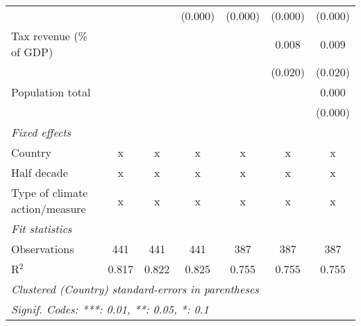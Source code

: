 \begin{tabular}{lcccccc}
                                                                                  &               &                & (0.000)        & (0.000)       & (0.000)      & (0.000)\\   
   Tax revenue (\% of GDP)                                                        &               &                &                &               & 0.008        & 0.009\\   
                                                                                  &               &                &                &               & (0.020)      & (0.020)\\   
   Population total                                                               &               &                &                &               &              & 0.000\\   
                                                                                  &               &                &                &               &              & (0.000)\\   
   \emph{Fixed effects}\\
   Country                                                                        & x             & x              & x              & x             & x            & x\\  
   Half decade                                                                    & x             & x              & x              & x             & x            & x\\  
   Type of climate action/measure                                                 & x             & x              & x              & x             & x            & x\\  
   \midrule \emph{Fit statistics}\\
   Observations                                                                   & 441           & 441            & 441            & 387           & 387          & 387\\  
   R$^2$                                                                          & 0.817         & 0.822          & 0.825          & 0.755         & 0.755        & 0.755\\  
   \midrule
   \multicolumn{7}{l}{\emph{Clustered (Country) standard-errors in parentheses}}\\
   \multicolumn{7}{l}{\emph{Signif. Codes: ***: 0.01, **: 0.05, *: 0.1}}\\
\end{tabular}
\par\endgroup


